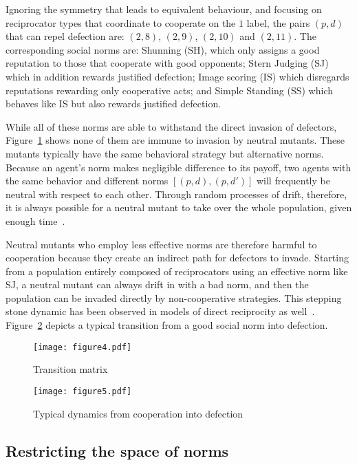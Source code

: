 \documentclass[sigconf]{aamas}  %
\begin{document}
Ignoring the symmetry that leads to equivalent behaviour, and focusing on reciprocator types that coordinate to cooperate on the $1$ label, the pairs $(p, d)$ that can repel defection are: $(2, 8)$, $(2, 9)$, $(2, 10)$ and $(2, 11)$. The corresponding social norms are: Shunning (SH), which only assigns a good reputation to those that cooperate with good opponents; Stern Judging (SJ) which in addition rewards justified defection; Image scoring (IS) which disregards reputations rewarding only cooperative acts; and Simple Standing (SS) which behaves like IS but also rewards justified defection.


While all of these norms are able to withstand the direct invasion of defectors, Figure~\ref{fig:transition} shows none of them are immune to invasion by neutral mutants. These mutants typically have the same behavioral strategy but alternative norms. Because an agent's norm makes negligible difference to its payoff, two agents with the same behavior and different norms $[(p,d),(p,d')]$ will frequently be neutral with respect to each other. Through random processes of drift, therefore, it is always possible for a neutral mutant to take over the whole population, given enough time~\cite{nowak:book:2006}. 

Neutral mutants who employ less effective norms are therefore harmful to cooperation because they create an indirect path for defectors to invade. Starting from a population entirely composed of reciprocators using an effective norm like SJ, a neutral mutant can always drift in with a bad norm, and then the population can be invaded directly by non-cooperative strategies. This stepping stone dynamic has been observed in models of direct reciprocity as well~\cite{van-veelen:PNAS:2012, garcia2016and}. Figure~\ref{dynamics} depicts a typical transition from a good social norm into defection.


\begin{figure}[b]
\texttt{[image: figure4.pdf]}
\caption{Transition matrix\label{fig:transition}}
\end{figure}


\begin{figure}
\texttt{[image: figure5.pdf]}
\caption{Typical dynamics from cooperation into defection\label{dynamics}}
\end{figure}


\subsection{Restricting the space of norms}
\end{document}
